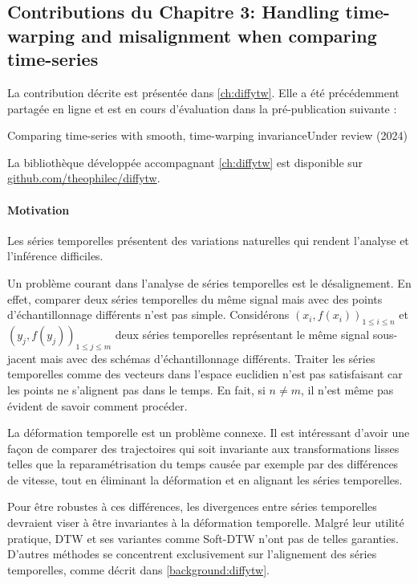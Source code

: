 \subsection{Contributions du Chapitre 3: Handling time-warping and misalignment when comparing time-series}
\begin{mdframed}
La contribution décrite est présentée dans \cref{ch:diffytw}.
\noindent Elle a été précédemment partagée en ligne et est en cours d'évaluation dans la pré-publication suivante :
\begin{mdframed}
{Comparing time-series with smooth, time-warping invariance}{Under review (2024)}
\end{mdframed}
La bibliothèque développée accompagnant \cref{ch:diffytw} est disponible sur \url{github.com/theophilec/diffytw}.
\end{mdframed}

\paragraph{Motivation}
Les séries temporelles présentent des variations naturelles qui rendent l'analyse et l'inférence difficiles.

Un problème courant dans l'analyse de séries temporelles est le désalignement. En effet, comparer deux séries temporelles du même signal mais avec des points d'échantillonnage différents n'est pas simple. Considérons $(x_i, f(x_i))_{1\leq i\leq n}$ et $(y_j, f(y_j))_{1 \leq j \leq m}$ deux séries temporelles représentant le même signal sous-jacent mais avec des schémas d'échantillonnage différents. Traiter les séries temporelles comme des vecteurs dans l'espace euclidien n'est pas satisfaisant car les points ne s'alignent pas dans le temps. En fait, si $n\neq m$, il n'est même pas évident de savoir comment procéder.

La déformation temporelle est un problème connexe. Il est intéressant d'avoir une façon de comparer des trajectoires qui soit invariante aux transformations lisses telles que la reparamétrisation du temps causée par exemple par des différences de vitesse, tout en éliminant la déformation et en alignant les séries temporelles.

Pour être robustes à ces différences, les divergences entre séries temporelles devraient viser à être invariantes à la déformation temporelle. Malgré leur utilité pratique, DTW \citep{dtw} et ses variantes comme Soft-DTW \citep{soft-dtw} n'ont pas de telles garanties. D'autres méthodes se concentrent exclusivement sur l'alignement des séries temporelles, comme décrit dans \cref{background:diffytw}.

